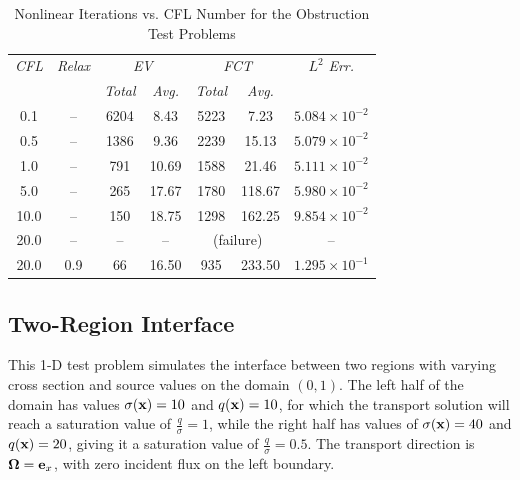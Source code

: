 \begin{table}[htb]\caption{Nonlinear Iterations vs. CFL Number for the
  Obstruction Test Problems}
\label{tab:obstruction_iterations}
\centering
\begin{tabular}{c c c c c c c}\hline
\emph{CFL} & \emph{Relax} & \multicolumn{2}{c}{\emph{EV}} & \multicolumn{2}{c}{\emph{FCT}} & $L^2$ \emph{Err.}\\
           &              & \emph{Total} & \emph{Avg.}    &  \emph{Total} & \emph{Avg.}    &\\\hline
0.1        & --  & 6204 &  8.43 & 5223 &   7.23 & $5.084\times10^{-2}$\\
0.5        & --  & 1386 &  9.36 & 2239 &  15.13 & $5.079\times 10^{-2}$\\
1.0        & --  & 791  & 10.69 & 1588 &  21.46 & $5.111\times 10^{-2}$\\
5.0        & --  & 265  & 17.67 & 1780 & 118.67 & $5.980\times 10^{-2}$\\
10.0       & --  & 150  & 18.75 & 1298 & 162.25 & $9.854\times 10^{-2}$\\
20.0       & --  & --   &    -- & \multicolumn{2}{c}{(failure)} & --\\
20.0       & 0.9 & 66   & 16.50 &  935 & 233.50 & $1.295\times 10^{-1}$\\
\hline\end{tabular}
\end{table}

\clearpage
\subsection{Two-Region Interface}
This 1-D test problem simulates the interface between two regions with
varying cross section and source values on the domain $(0,1)$.
The left half of the domain has values $\sigma(\mathbf{x})=10$ and $q(\mathbf{x})=10$, for which the transport
solution will reach a
saturation value of $\frac{q}{\sigma}=1$, while the right half has values
of $\sigma(\mathbf{x})=40$ and $q(\mathbf{x})=20$, giving it a saturation value of
$\frac{q}{\sigma}=0.5$. The transport direction is $\mathbf{\Omega}=\mathbf{e}_x$, with
zero incident flux on the left boundary.

